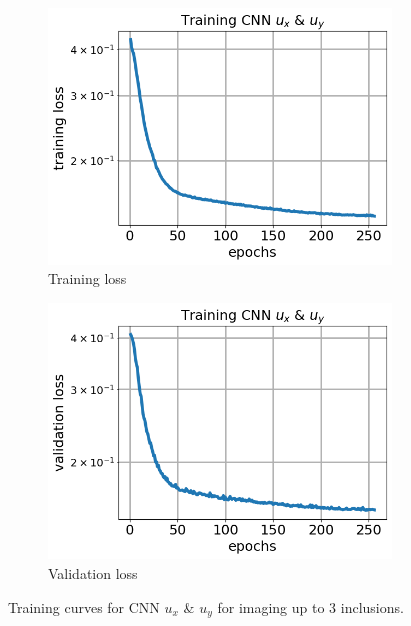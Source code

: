 \documentclass[12pt]{article}
\newcommand{\nhgfigheight}{4.0cm}
\begin{document}
\begin{figure}[h]
  \centering
  \begin{subfigure}[b]{0.45\linewidth}
    \includegraphics[totalheight=\nhgfigheight]{Figures/final3/training/uxuy/field_images_plot_loss.png}
    \caption{Training loss}
  \end{subfigure}
  \begin{subfigure}[b]{0.45\linewidth}
    \includegraphics[totalheight=\nhgfigheight]{Figures/final3/training/uxuy/field_images_plot_val_loss.png}
    \caption{Validation loss}
  \end{subfigure}
  \caption{\label{fig:threeinc:trainuxuy} Training curves for CNN $u_x$ \& $u_y$ for imaging up to 3 inclusions.}
\end{figure}
\end{document}
